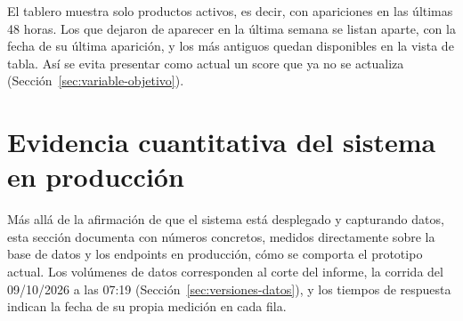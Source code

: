 El tablero muestra solo productos activos, es decir, con apariciones en las últimas 48 horas. Los que dejaron de aparecer en la última semana se listan aparte, con la fecha de su última aparición, y los más antiguos quedan disponibles en la vista de tabla. Así se evita presentar como actual un score que ya no se actualiza (Sección~\ref{sec:variable-objetivo}).

\section{Evidencia cuantitativa del sistema en producción}\label{sec:evidencia-cuantitativa}

Más allá de la afirmación de que el sistema está desplegado y capturando datos, esta sección documenta con números concretos, medidos directamente sobre la base de datos y los endpoints en producción, cómo se comporta el prototipo actual. Los volúmenes de datos corresponden al corte del informe, la corrida del 09/10/2026 a las 07:19 (Sección~\ref{sec:versiones-datos}), y los tiempos de respuesta indican la fecha de su propia medición en cada fila.

